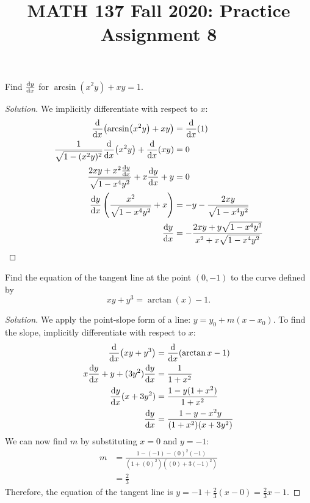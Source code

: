 \documentclass{agony}
\title{MATH 137 Fall 2020: Practice Assignment 8}
\begin{document}
\thispagestyle{firstpage}

\textbf{\thetitle}

\question Find $\dv{y}{x}$ for $\arcsin(x^2y)+xy=1$.
\begin{proof}[Solution]
  We implicitly differentiate with respect to $x$:
  \begin{align*}
    \dv{x}(\arcsin(x^2y) + xy)                            & = \dv{x}(1)                                                   \\
    \frac{1}{\sqrt{1-(x^2 y)^2}}\dv{x}(x^2y) + \dv{x}(xy) & = 0                                                           \\
    \frac{2xy + x^2\dv{y}{x}}{\sqrt{1-x^4y^2}} + x\dv{y}{x} + y     & = 0                                                           \\
    \dv{y}{x}{}\left(\frac{x^2}{\sqrt{1-x^4y^2}}+x\right)      & = - y - \frac{2xy}{\sqrt{1-x^4y^2}}                           \\
    \dv{y}{x}                                                  & = -\frac{2xy+y\sqrt{1-x^4y^2}}{x^2+x\sqrt{1-x^4y^2}} \qedhere
  \end{align*}
\end{proof}


\question Find the equation of the tangent line at the point $(0, -1)$ to the curve defined by
\[ xy+y^3 = \arctan(x)-1. \]
\begin{proof}[Solution]
  We apply the point-slope form of a line: $y = y_0+m(x-x_0)$.
  To find the slope, implicitly differentiate with respect to $x$:
  \begin{align*}
    \dv{x}(xy+y^3)         & = \dv{x}(\arctan x - 1)            \\
    x\dv{y}{x} + y + (3y^2)\dv{y}{x} & = \frac{1}{1+x^2}                  \\
    \dv{y}{x}{}(x+3y^2)         & = \frac{1-y(1+x^2)}{1+x^2}         \\
    \dv{y}{x}                   & = \frac{1-y-x^2y}{(1+x^2)(x+3y^2)}
  \end{align*}
  We can now find $m$ by substituting $x=0$ and $y=-1$:
  \begin{align*}
    m & = \frac{1-(-1)-(0)^2(-1)}{(1+(0)^2)((0)+3(-1)^2)} \\
      & = \frac23
  \end{align*}
  Therefore, the equation of the tangent line is $y = -1 + \frac23(x-0) = \frac23x - 1$.
\end{proof}
\end{document}
